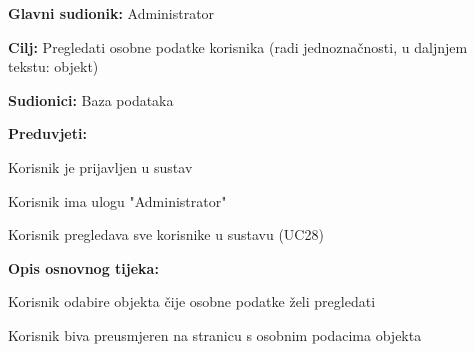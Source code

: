 					\noindent {}
					\begin{packed_item}
	
						\item \textbf{Glavni sudionik: } Administrator
						\item  \textbf{Cilj:} Pregledati osobne podatke korisnika (radi jednoznačnosti, u daljnjem tekstu: objekt)
						\item  \textbf{Sudionici:} Baza podataka
						\item  \textbf{Preduvjeti:}
						\item[] \begin{packed_enum}
							\item Korisnik je prijavljen u sustav
							\item Korisnik ima ulogu "Administrator"
							\item Korisnik pregledava sve korisnike u sustavu (UC28)
						\end{packed_enum}
						\item  \textbf{Opis osnovnog tijeka:}
						
						\item[] \begin{packed_enum}
	
							\item Korisnik odabire objekta čije osobne podatke želi pregledati
							\item Korisnik biva preusmjeren na stranicu s osobnim podacima objekta
						\end{packed_enum}
						
					\end{packed_item}
					

